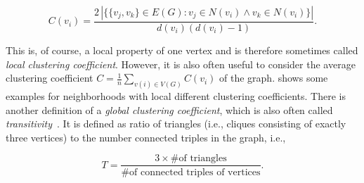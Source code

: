 \begin{equation}
 C(v_i) = \frac{2 \, |\{\{v_j, v_k\} \in E(G) : v_j \in N(v_i) \wedge v_k \in N(v_i)\}| }{d(v_i)(d(v_i) - 1)}.
\end{equation}

This is, of course, a local property of one vertex and is therefore sometimes called \emph{local clustering coefficient}.
However, it is also often useful to consider the average clustering coefficient \( C = \frac{1}{n} \sum_{v(i) \in V(G)} C(v_i) \) of the graph.
 shows some examples for neighborhoods with local different clustering coefficients.
There is another definition of a \emph{global clustering coefficient}, which is also often called \emph{transitivity}~\cite{Boccaletti2006}.
It is defined as ratio of triangles (i.e., cliques consisting of exactly three vertices) to the number connected triples in the graph, i.e.,

\begin{equation}
 T = \frac{3 \times \text{\# of triangles}}{\text{\# of connected triples of vertices}}.
\end{equation}


